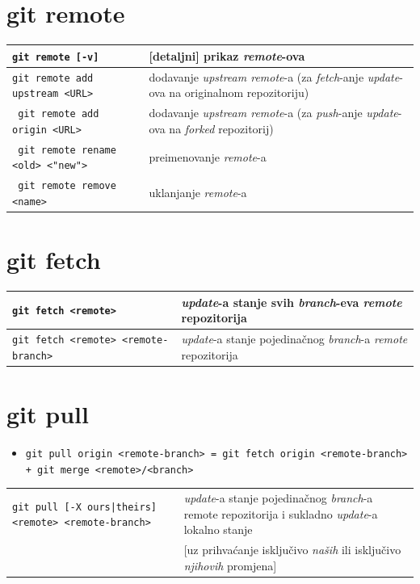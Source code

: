 \documentclass[10pt]{article}
\begin{document}
    \section*{\color{BrickRed} git remote}
    \begin{tabular}{|>{\tt}p{9.25cm}|>{}p{15.50cm}|}
        \hline
        git remote [-v]                                 & [detaljni] prikaz \textit{remote}-ova \\ \hline
        git remote add upstream <URL>                   & dodavanje \textit{upstream remote}-a (za \textit{fetch}-anje \textit{update}-ova na originalnom repozitoriju) \\ \hline
        git remote add origin <URL>                     & dodavanje \textit{upstream remote}-a (za \textit{push}-anje \textit{update}-ova na \textit{forked} repozitorij) \\ \hline
        git remote rename <old> <"new">                 & preimenovanje \textit{remote}-a \\ \hline  
        git remote remove <name>                        & uklanjanje \textit{remote}-a \\ \hline                 
    \end{tabular}

    \section*{\color{BrickRed} git fetch}
    \begin{tabular}{|>{\tt}p{9.25cm}|>{}p{15.50cm}|}
        \hline
        git fetch <remote>                              & \textit{update}-a stanje svih \textit{branch}-eva \textit{remote} repozitorija \\ \hline
        git fetch <remote> <remote-branch>              & \textit{update}-a stanje pojedinačnog \textit{branch}-a \textit{remote} repozitorija \\ \hline                
    \end{tabular}

    \section*{\color{BrickRed} git pull}
    \begin{itemize}
        \item \texttt{git pull origin <remote-branch> = git fetch origin <remote-branch> + git merge <remote>/<branch>}
    \end{itemize}
    \begin{tabular}{|>{\tt}p{9.25cm}|>{}p{15.50cm}|}
        \hline
        git pull [-X ours|theirs] <remote> <remote-branch>      & \textit{update}-a stanje pojedinačnog \textit{branch}-a remote repozitorija i sukladno \textit{update}-a lokalno stanje   \\                
                                                                & [uz prihvaćanje isključivo \textit{naših} ili isključivo \textit{njihovih} promjena]                                                            \\ \hline                
    \end{tabular}
\end{document}
